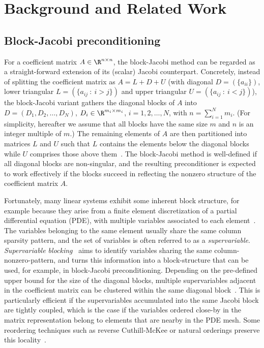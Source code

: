 \section{Background and Related Work}
\label{2017-lu-block-jacobi:sec:related}


\subsection{Block-Jacobi preconditioning}
For a coefficient matrix $A\in \R^{n \times n}$, 
the block-Jacobi method can be regarded 
as a straight-forward extension of its (scalar) Jacobi counterpart.
Concretely, instead of splitting the  
coefficient matrix as $A=L+D+U$
(with diagonal $D=(\{a_{ii}\})$, lower triangular $L=(\{a_{ij}~:~i>j\})$ and upper triangular $U=(\{a_{ij}~:~i<j\})$),
the block-Jacobi variant gathers 
the diagonal blocks of $A$ 
into $D=(D_1,D_2,\ldots,D_N)$, $D_i\in \R^{m_i \times m_i}$, $i=1,2,\ldots,N$,
with $n=\sum_{i=1}^Nm_i$. 
(For simplicity, hereafter we assume that all blocks have the same size $m$ and $n$ is an integer multiple of $m$.)
The remaining elements of $A$ are then partitioned into matrices $L$ and $U$ such that
$L$ contains the elements below the diagonal blocks
while $U$ comprises those  above them~\cite{gje}.
The block-Jacobi method is well-defined if all diagonal 
blocks are non-singular, and the resulting preconditioner is expected to work effectively
if the blocks succeed in reflecting the nonzero structure of the coefficient matrix $A$.

Fortunately, many linear systems exhibit some inherent block structure,
for example because they arise from a finite element discretization
of a partial differential equation (PDE), with multiple variables associated to each element~\cite{gje}.
The variables belonging to the same element usually share the same column sparsity pattern,
and the set of variables is often referred to as a {\it supervariable}.
 {\it Supervariable blocking}~\cite{jenniferscott} aims to identify
 variables sharing the same column-nonzero-pattern, and turns this information
 into a block-structure that can be used, for example, in block-Jacobi preconditioning.
Depending on the pre-defined upper bound for the size of the diagonal blocks,
multiple supervariables adjacent in the coefficient matrix 
 can be clustered within the same diagonal block~\cite{jenniferscott}.
This is particularly efficient if the supervariables
accumulated into the same Jacobi block are tightly coupled,
which is the case if the variables ordered close-by in the matrix representation 
belong to elements that are nearby in the PDE mesh.
Some reordering techniques such as reverse Cuthill-McKee or natural orderings
preserve this locality~\cite{jenniferscott}.  

